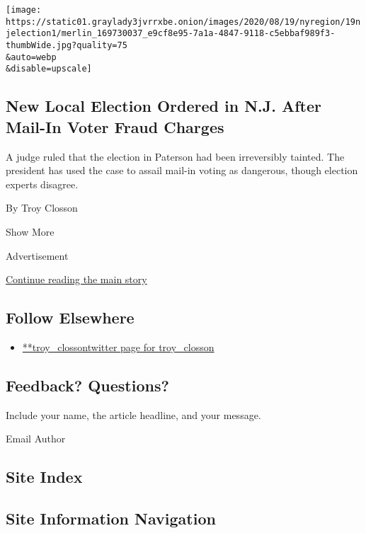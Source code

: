 \begin{enumerate}
  \texttt{[image: https://static01.graylady3jvrrxbe.onion/images/2020/08/19/nyregion/19njelection1/merlin\_169730037\_e9cf8e95-7a1a-4847-9118-c5ebbaf989f3-thumbWide.jpg?quality=75\\\&auto=webp\\\&disable=upscale]}

  \hypertarget{new-local-election-ordered-in-nj-after-mail-in-voter-fraud-charges}{%
  \subsection{New Local Election Ordered in N.J. After Mail-In Voter
  Fraud
  Charges}\label{new-local-election-ordered-in-nj-after-mail-in-voter-fraud-charges}}

  A judge ruled that the election in Paterson had been irreversibly
  tainted. The president has used the case to assail mail-in voting as
  dangerous, though election experts disagree.

  By Troy Closson
\end{enumerate}

Show More

Advertisement

\protect\hyperlink{after-mid2}{Continue reading the main story}

\hypertarget{follow-elsewhere}{%
\subsection{Follow Elsewhere}\label{follow-elsewhere}}

\begin{itemize}
\tightlist
\item
  \href{https://twitter.com/troy_closson}{**troy\_clossontwitter page
  for troy\_closson}
\end{itemize}

\hypertarget{feedback-questions}{%
\subsection{Feedback? Questions?}\label{feedback-questions}}

Include your name, the article headline, and your message.

Email Author

\hypertarget{site-index}{%
\subsection{Site Index}\label{site-index}}

\hypertarget{site-information-navigation}{%
\subsection{Site Information
Navigation}\label{site-information-navigation}}

